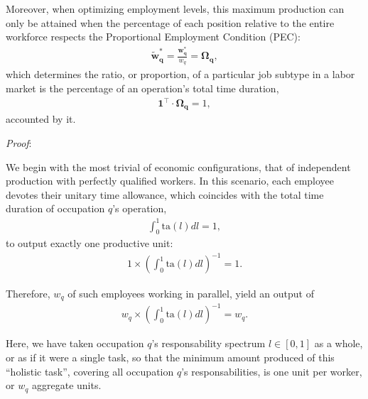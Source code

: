 \documentclass[hidelinks, nonatbib]{elsarticle}
\begin{document}
\begin{enumerate}
    Moreover, when optimizing employment levels, this maximum production can only be attained when the percentage of each position relative to the entire workforce respects the Proportional Employment Condition (PEC):
    \begin{gather}
        \boldsymbol{\tilde{w}_{q}^{*}}
        =
        \frac{
            \boldsymbol{w_{q}^{*}}
        }{
            w_q
        }
        =
        \boldsymbol{\Omega_{q}}
        ,
    \end{gather}
    which determines the ratio, or proportion, of a particular job subtype in a labor market is the percentage of an operation's total time duration,
    \begin{gather}
        \boldsymbol{1} ^ {\top}
        \cdot
        \boldsymbol{\Omega_{q}}
        = 1
        ,
    \end{gather}
    accounted by it.
    
    \textit{Proof}:

    We begin with the most trivial of economic configurations, that of independent production with perfectly qualified workers. In this scenario, each employee devotes their unitary time allowance, which coincides with the total time duration of occupation $q$'s operation,
    \begin{gather}
        \int_{0}^{1}{
            \text{ta}(l)
            dl
        }
        =
        1
        ,
    \end{gather}
    to output exactly one productive unit:
    \begin{gather}
        1
        \times
        \left(
            \int_{0}^{1}{
                \text{ta}(l)dl
            }
        \right) ^ {-1}
        =
        1
        .
    \end{gather}

    Therefore, $w_q$ of such employees working in parallel, yield an output of
    \begin{align}
        w_q 
        \times 
        \left(
            \int_{0}^{1}{
                \text{ta}(l)dl
            }
        \right) ^ {-1}
        =
        w_q
        .
    \end{align}

    Here, we have taken occupation $q$'s responsability spectrum $l \in [0,1]$ as a whole, or as if it were a single task, so that the minimum amount produced of this ``holistic task'', covering all occupation $q$'s responsabilities, is one unit per worker, or $w_q$ aggregate units.


\end{enumerate}
\end{document}
